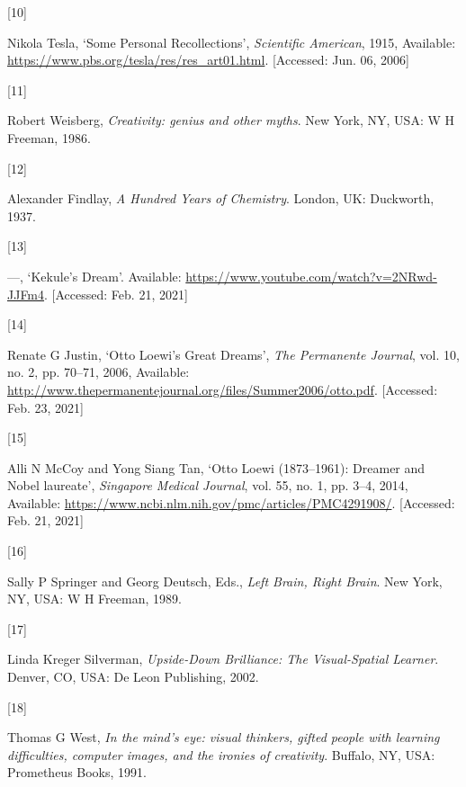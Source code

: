 \documentclass[
  a4paper,
]{article}
\newlength{\cslhangindent}
\newlength{\csllabelwidth}
\newlength{\cslentryspacingunit} %
\newenvironment{CSLReferences}[2] %
 {%
  \setlength{\parindent}{0pt}
  \ifodd #1
  \let\oldpar\par
  \def\par{\hangindent=\cslhangindent\oldpar}
  \fi
  \setlength{\parskip}{#2\cslentryspacingunit}
 }%
 {}
\newcommand{\CSLLeftMargin}[1]{\parbox[t]{\csllabelwidth}{#1}}
\newcommand{\CSLRightInline}[1]{\parbox[t]{\linewidth - \csllabelwidth}{#1}\break}
\begin{document}
\begin{CSLReferences}{0}{0}
\leavevmode{}%
\CSLLeftMargin{{[}10{]} }%
\CSLRightInline{Nikola Tesla, {`{Some Personal Recollections}'},
\emph{Scientific American}, 1915, Available:
\url{https://www.pbs.org/tesla/res/res_art01.html}. {[}Accessed: Jun.
06, 2006{]}}

\leavevmode{}%
\CSLLeftMargin{{[}11{]} }%
\CSLRightInline{Robert Weisberg, \emph{{Creativity: genius and other
myths}}. New York, NY, USA: W H Freeman, 1986.}

\leavevmode{}%
\CSLLeftMargin{{[}12{]} }%
\CSLRightInline{Alexander Findlay, \emph{{A Hundred Years of
Chemistry}}. London, UK: Duckworth, 1937.}

\leavevmode{}%
\CSLLeftMargin{{[}13{]} }%
\CSLRightInline{---, {`{Kekule's Dream}'}. Available:
\url{https://www.youtube.com/watch?v=2NRwd-JJFm4}. {[}Accessed: Feb. 21,
2021{]}}

\leavevmode{}%
\CSLLeftMargin{{[}14{]} }%
\CSLRightInline{Renate G Justin, {`{Otto Loewi's Great Dreams}'},
\emph{The Permanente Journal}, vol. 10, no. 2, pp. 70--71, 2006,
Available:
\url{http://www.thepermanentejournal.org/files/Summer2006/otto.pdf}.
{[}Accessed: Feb. 23, 2021{]}}

\leavevmode{}%
\CSLLeftMargin{{[}15{]} }%
\CSLRightInline{Alli N McCoy and Yong Siang Tan, {`{Otto Loewi
(1873--1961): Dreamer and Nobel laureate}'}, \emph{Singapore Medical
Journal}, vol. 55, no. 1, pp. 3--4, 2014, Available:
\url{https://www.ncbi.nlm.nih.gov/pmc/articles/PMC4291908/}.
{[}Accessed: Feb. 21, 2021{]}}

\leavevmode{}%
\CSLLeftMargin{{[}16{]} }%
\CSLRightInline{Sally P Springer and Georg Deutsch, Eds., \emph{{Left
Brain, Right Brain}}. New York, NY, USA: W H Freeman, 1989.}

\leavevmode{}%
\CSLLeftMargin{{[}17{]} }%
\CSLRightInline{Linda Kreger Silverman, \emph{{Upside-Down Brilliance:
The Visual-Spatial Learner}}. Denver, CO, USA: De Leon Publishing,
2002.}

\leavevmode{}%
\CSLLeftMargin{{[}18{]} }%
\CSLRightInline{Thomas G West, \emph{{In the mind's eye: visual
thinkers, gifted people with learning difficulties, computer images, and
the ironies of creativity}}. Buffalo, NY, USA: Prometheus Books, 1991.}


\end{CSLReferences}
\end{document}
